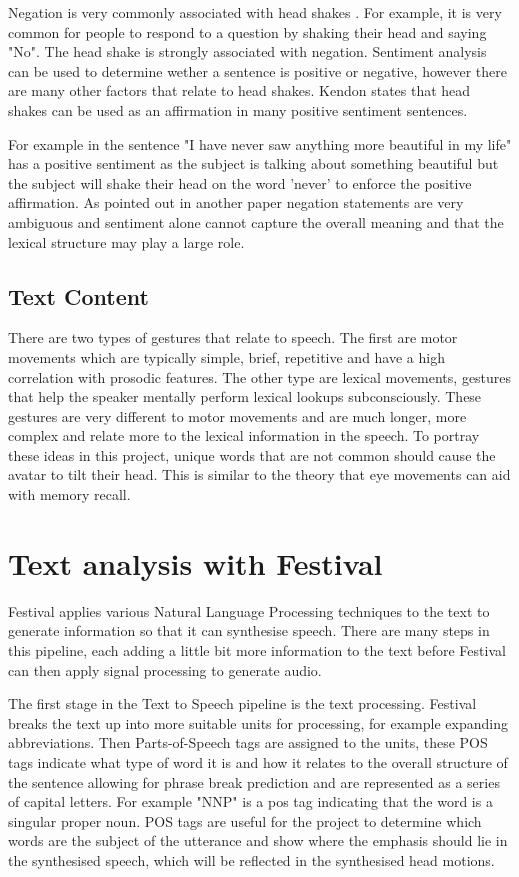 \documentclass[bsc,frontabs,twoside,singlespacing,parskip]{infthesis}
\begin{document}
Negation is very commonly associated with head shakes \cite{head_shaking}. For example, it is very common for people to respond to a question by shaking their head and saying "No". The head shake is strongly associated with negation. Sentiment analysis can be used to determine wether a sentence is positive or negative, however there are many other factors that relate to head shakes. Kendon states that head shakes can be used as an affirmation \cite{kendon} in many positive sentiment sentences. 

For example in the sentence "I have never saw anything more beautiful in my life" has a positive sentiment as the subject is talking about something beautiful but the subject will shake their head on the word 'never' to enforce the positive affirmation. As pointed out in another paper \cite{negative_sentiment} negation statements are very ambiguous and sentiment alone cannot capture the overall meaning and that the lexical structure may play a large role.

\subsection{Text Content}

There are two types of gestures that relate to speech. \cite{lexical_gestures} The first are motor movements which are typically simple, brief, repetitive and have a high correlation with prosodic features. The other type are lexical movements, gestures that help the speaker mentally perform lexical lookups subconsciously. These gestures are very different to motor movements and are much longer, more complex and relate more to the lexical information in the speech. To portray these ideas in this project, unique words that are not common should cause the avatar to tilt their head. This is similar to the theory that eye movements can aid with memory recall. \cite{eye_movements}

\section{Text analysis with Festival}

Festival applies various Natural Language Processing techniques to the text to generate information  so that it can synthesise speech.  There are many steps in this pipeline, each adding a little bit more information to the text before Festival can then apply signal processing to generate audio. 

The first stage in the Text to Speech pipeline is the text processing. Festival breaks the text up into more suitable units for processing, for example expanding abbreviations. Then Parts-of-Speech tags are assigned to the units, these POS tags indicate what type of word it is and how it relates to the overall structure of the sentence allowing for phrase break prediction and are represented as a series of capital letters. For example "NNP" is a pos tag indicating that the word is a singular proper noun. POS tags are useful for the project to determine which words are the subject of the utterance and show where the emphasis should lie in the synthesised speech, which will be reflected in the synthesised head motions.
\end{document}
